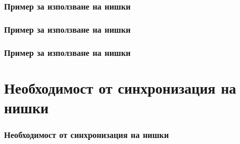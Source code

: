 \documentclass[ignorenonframetext, hyperref=unicode,compress]{beamer}
\begin{document}
\begin{frame}[containsverbatim,shrink=5]
\frametitle{Пример за използване на нишки}

\end{frame}

\begin{frame}[containsverbatim,shrink=5]
\frametitle{Пример за използване на нишки}

\end{frame}


\begin{frame}[containsverbatim,shrink=5]
\frametitle{Пример за използване на нишки}

\end{frame}

\begin{frame}[containsverbatim,shrink=5]

\end{frame}

\begin{frame}[containsverbatim,shrink=5]

\end{frame}

\section{Необходимост от синхронизация на нишки}
\begin{frame}[containsverbatim,shrink=5]
\frametitle{Необходимост от синхронизация на нишки}

\end{frame}
\end{document}
